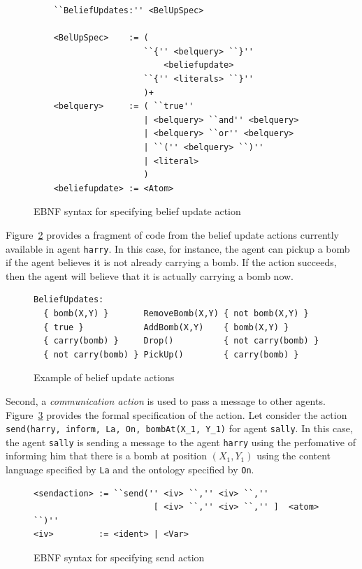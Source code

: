 \documentclass[a4paper]{article}
\begin{document}
\begin{figure}[htp]
\begin{verbatim}
	``BeliefUpdates:'' <BelUpSpec>
	
	<BelUpSpec>    := (
	                  ``{'' <belquery> ``}''
	                      <beliefupdate>
	                  ``{'' <literals> ``}''
	                  )+
	<belquery>     := ( ``true'' 
	                  | <belquery> ``and'' <belquery>
	                  | <belquery> ``or'' <belquery>
	                  | ``('' <belquery> ``)''
	                  | <literal>
	                  )
	<beliefupdate> := <Atom>
\end{verbatim}
\caption{EBNF syntax for specifying belief update action}
\label{fig:ebnf_beliefupdate}
\end{figure}

Figure~\ref{fig:example_beliefupdate} provides a fragment of code from the belief update actions currently available in agent \texttt{harry}. In this case, for instance, the agent can pickup a bomb if the agent believes it is not already carrying a bomb. If the action succeeds, then the agent will believe that it is actually carrying a bomb now. %

\begin{figure}[htp]
\begin{verbatim}
BeliefUpdates:
  { bomb(X,Y) }       RemoveBomb(X,Y) { not bomb(X,Y) }
  { true }            AddBomb(X,Y)    { bomb(X,Y) }
  { carry(bomb) }     Drop()          { not carry(bomb) }
  { not carry(bomb) } PickUp()        { carry(bomb) }
\end{verbatim}
\caption{Example of belief update actions}
\label{fig:example_beliefupdate}
\end{figure}

Second, a \emph{communication action} is used to pass a message to other agents. Figure~\ref{fig:ebnf_sendaction} provides the formal specification of the action. Let consider the action \texttt{send(harry, inform, La, On, bombAt(X\_1, Y\_1)} for agent \texttt{sally}. In this case, the agent \texttt{sally} is sending a message to the agent \texttt{harry} using the perfomative of informing him that there is a bomb at position $(X_1, Y_1)$ using the content language specified by \texttt{La} and the ontology specified by \texttt{On}.

\begin{figure}[htp]
\begin{verbatim}
<sendaction> := ``send('' <iv> ``,'' <iv> ``,''
                        [ <iv> ``,'' <iv> ``,'' ]  <atom> ``)''  
<iv>         := <ident> | <Var>
\end{verbatim}
\caption{EBNF syntax for specifying send action}
\label{fig:ebnf_sendaction}
\end{figure}
\end{document}
